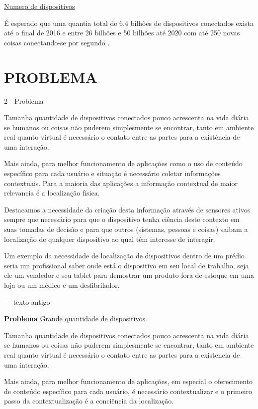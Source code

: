 \documentclass[
	12pt,				%
	openright,			%
	oneside,			%
	a4paper,			%
	chapter=TITLE,		%
	english,			%
	french,				%
	spanish,			%
	brazil				%
	]{abntex2}
\begin{document}
{\underline{Numero de dispositivos}

É esperado que uma quantia total de 6,4 bilhões de dispositivos conectados
exista até o final de 2016 \cite{GARTNER2015} e entre 26 bilhões
\cite{GARTNER2014}  e 50 bilhões até 2020 com até 250 novas coisas conectando-se
por segundo \cite{CiscoBlog2013}.


\chapter{PROBLEMA}
\label{chap:PROBLEMA}

 2 - Problema

Tamanha quantidade de dispositivos conectados pouco acrescenta na vida diária se
humanos ou coisas não puderem simplesmente se encontrar, tanto em ambiente real
quanto virtual é necessário o contato entre as partes para a existência de uma
interação.

Mais ainda, para melhor funcionamento de aplicações como o uso de conteúdo
específico para cada usuário e situação é necessário coletar informações
contextuais. Para a maioria das aplicações a informação contextual de maior
relevancia é a localização física.

Destacamos a necessidade da criação desta informação através de sensores ativos
sempre que necessário para que o dispositivo tenha ciência deste contexto em
suas tomadas de decisão e para que outros (sistemas, pessoas e coisas) saibam a
localização de qualquer dispositivo ao qual têm interesse de interagir.

Um exemplo da necessidade de localização de dispositivos dentro de um prédio
seria um profissional saber onde está o dispositivo em seu local de trabalho,
seja ele um vendedor e seu tablet para demostrar um produto fora de estoque em
uma loja ou um médico e um desfibrilador.

--- texto antigo ---

\textbf{\underline{Problema}}
\underline{Grande quantidade de dispositivos}

Tamanha quantidade de dispositivos conectados pouco acrescenta na vida diária se
humanos ou coisas não puderem simplesmente se encontrar, tanto em ambiente real
quanto virtual é necessário o contato entre as partes para a existencia de uma
interação.

Mais ainda, para melhor funcionamento de aplicações, em especial o oferecimento
de conteúdo específico para cada usuário, é necessário contextualizar e o
primeiro passo da contextualização é a conciência da localização.

}
\end{document}
